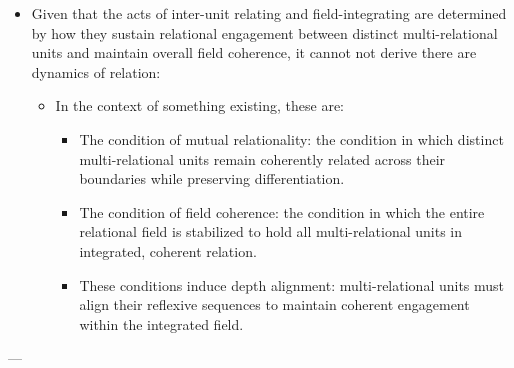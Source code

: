 \documentclass[11pt]{article}
\begin{document}
\begin{itemize}
\item Given that the acts of inter-unit relating and field-integrating are determined by how they sustain relational engagement between distinct multi-relational units and maintain overall field coherence, it cannot not derive there are dynamics of relation:

\begin{itemize}
\item In the context of something existing, these are:

\begin{itemize}
\item The condition of mutual relationality: the condition in which distinct multi-relational units remain coherently related across their boundaries while preserving differentiation.

\item The condition of field coherence: the condition in which the entire relational field is stabilized to hold all multi-relational units in integrated, coherent relation.
\item These conditions induce depth alignment: multi-relational units must align their reflexive sequences to maintain coherent engagement within the integrated field.
\end{itemize}
\end{itemize}
\end{itemize}

---
\end{document}
